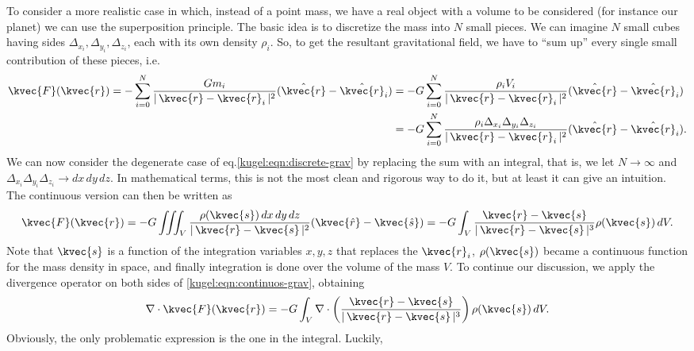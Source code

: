 To consider a more realistic case in which, instead of a point mass, we have a
real object with a volume to be considered (for instance our planet) we can use
the superposition principle.  The basic idea is to discretize the mass into $N$
small pieces. We can imagine $N$ small cubes having sides $\Delta_{x_i},
\Delta_{y_i}, \Delta_{z_i}$, each with its own density $\rho_i$.  So, to get the
resultant gravitational field, we have to ``sum up'' every single small
contribution of these pieces, i.e.
\begin{align}
  \kvec{F}(\kvec{r})
  = -\sum_{i=0}^N \frac{G m_i}{|\, \kvec{r}-\kvec{r}_i \,|^2}
    (\hat{\kvec{r}}-\hat{\kvec{r}}_i)
  &= -G \sum_{i=0}^N \frac{\rho_i V_i}{|\, \kvec{r}-\kvec{r}_i \,|^2}
    (\hat{\kvec{r}}-\hat{\kvec{r}}_i) \nonumber \\
  &= -G \sum_{i=0}^N \frac{
      \rho_i \Delta_{x_i}\Delta_{y_i}\Delta_{z_i}
    }{|\, \kvec{r}-\kvec{r}_i \,|^2}
    (\hat{\kvec{r}}-\hat{\kvec{r}}_i). \label{kugel:eqn:discrete-grav}
\end{align}
We can now consider the degenerate case of eq.\eqref{kugel:eqn:discrete-grav} by replacing the sum with an integral,
that is, we let $N\to \infty$ and $\Delta_{x_i}\Delta_{y_i}\Delta_{z_i}\to
dx \, dy \, dz$. In mathematical terms, this is not the most clean and rigorous way to
do it, but at least it can give an intuition. The continuous version can then be written as 
\begin{equation}
  \kvec{F}(\kvec{r}) 
    = -G \iiint_{V}
      \frac{\rho(\kvec{s})\, dx \, dy \, dz}{|\, \kvec{r} - \kvec{s} \,|^2}
      (\kvec{\hat{r}} - \kvec{\hat{s}})
    = -G \int_{V}
      \frac{\kvec{r}-\kvec{s}}{|\, \kvec{r}-\kvec{s} \,|^3}
      \rho(\kvec{s}) \, dV.
      \label{kugel:eqn:continuos-grav} 
\end{equation}
Note that $\kvec{s}$ is a function of the integration variables $x,y,z$ that
replaces the $\kvec{r}_i$, $\rho(\kvec{s})$ became a continuous function for the
mass density in space, and finally integration is done over the volume of the
mass $V$. To continue our discussion, we apply the divergence operator on both
sides of \eqref{kugel:eqn:continuos-grav}, obtaining
\begin{equation}
  \nabla \cdot  \kvec{F}(\kvec{r})
    = -G \int_{V} \nabla \cdot \left(
      \frac{\kvec{r} - \kvec{s}}{|\, \kvec{r} - \kvec{s} \,|^3}
    \right) \rho(\kvec{s}) \, dV.
  \label{kugel:eq:continuos-grav-with-div} 
\end{equation}
Obviously, the only problematic expression is the one in the integral. Luckily,

